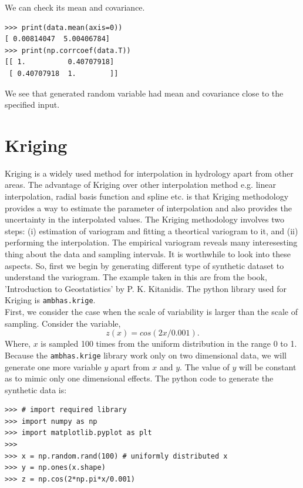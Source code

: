 \documentclass[10pt]{book}
\begin{document}
We can check its mean and covariance.
\beforeverb \begin{verbatim}
>>> print(data.mean(axis=0))
[ 0.00814047  5.00406784]
>>> print(np.corrcoef(data.T))
[[ 1.          0.40707918]
 [ 0.40707918  1.        ]]
\end{verbatim} \afterverb
We see that generated random variable had mean and covariance close to the specified input. 


\section{Kriging}
Kriging is a widely used method for interpolation in hydrology apart from other areas. The advantage of Kriging over other interpolation method e.g. linear interpolation, radial basis function and  spline etc. is that Kriging methodology provides a way to estimate the parameter of interpolation and also provides the uncertainty in the interpolated values. The Kriging methodology involves two steps: (i) estimation of variogram and fitting a theortical variogram to it, and (ii) performing the interpolation. The empirical variogram reveals many interesesting thing about the data and sampling intervals. It is worthwhile to look into these aspects. So, first we begin by generating different type of synthetic dataset to understand the variogram. The example taken in this are from the book, 'Introduction to Geostatistics' by P. K. Kitanidis. The python library used for Kriging is \verb"ambhas.krige".\\

First, we consider the case when the scale of variability is larger than the scale of sampling. Consider the variable,
\begin{equation}
z(x) = cos(2 x/0.001).
\end{equation}
Where, $x$ is sampled 100 times from the uniform distribution in the range 0 to 1. Because the \verb"ambhas.krige" library work only on two dimensional data, we will generate one more variable $y$ apart from $x$ and $y$. The value of $y$ will be constant as to mimic only one dimensional effects. The python code to generate the synthetic data is:

\beforeverb \begin{verbatim}
>>> # import required library
>>> import numpy as np
>>> import matplotlib.pyplot as plt
>>> 
>>> x = np.random.rand(100) # uniformly distributed x
>>> y = np.ones(x.shape) 
>>> z = np.cos(2*np.pi*x/0.001) 
\end{verbatim} \afterverb
\end{document}

